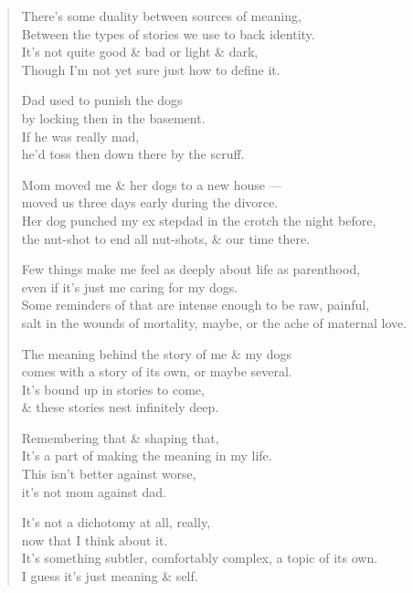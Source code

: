 \begin{verse}
  There's some duality between sources of meaning,\\
  \vin Between the types of stories we use to back identity.\\
  It's not quite good \& bad or light \& dark,\\
  \vin Though I'm not yet sure just how to define it.

  Dad used to punish the dogs\\
  \vin by locking then in the basement.\\
  If he was really mad,\\
  \vin he'd toss then down there by the scruff.

  Mom moved me \& her dogs to a new house ---\\
  \vin moved us three days early during the divorce.\\
  Her dog punched my ex stepdad in the crotch the night before,\\
  \vin the nut-shot to end all nut-shots, \& our time there.

  Few things make me feel as deeply about life as parenthood,\\
  \vin even if it's just me caring for my dogs.\\
  Some reminders of that are intense enough to be raw, painful,\\
  \vin salt in the wounds of mortality, maybe, or the ache of maternal love.

  The meaning behind the story of me \& my dogs\\
  \vin comes with a story of its own, or maybe several.\\
  It's bound up in stories to come,\\
  \vin \& these stories nest infinitely deep.

  Remembering that \& shaping that,\\
  \vin It's a part of making the meaning in my life.\\
  This isn't better against worse,\\
  \vin it's not mom against dad.

  It's not a dichotomy at all, really,\\
  \vin now that I think about it.\\
  It's something subtler, comfortably complex, a topic of its own.\\
  \vin I guess it's just meaning \& self.
\end{verse}
